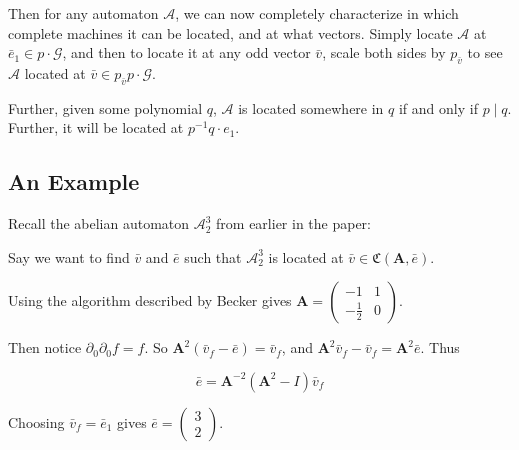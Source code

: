 \documentclass[12pt]{article}
\newcommand{\A}{\mathcal{A}}
\newcommand{\G}{\mathcal{G}}
\newcommand{\C}{\mathfrak{C}(\Am,\e)}
\newcommand{\2}{\textbf{2}}
\newcommand{\Am}{\textbf{A}}
\newcommand{\del}{\partial}
\renewcommand{\v}{\bar{v}}
\newcommand{\e}{\bar{e}}
\begin{document}
Then for any automaton $\A$, we can now completely characterize in
which complete machines it can be located, and at what vectors.
Simply locate $\A$ at $\e_1 \in p \cdot \G$, and then to locate it at
any odd vector $\v$, scale both sides by $p_{\v}$ to see $\A$ located at
$\v \in p_{\v} p \cdot \G$.

Further, given some polynomial $q$, $\A$ is located somewhere in $q$ 
if and only if $p \mid q$. Further, it will be located at 
$p^{-1}q \cdot e_1$.

\subsection{An Example}

Recall the abelian automaton $\A^3_2$ from earlier in the paper:

\begin{center}
\end{center}

Say we want to find $\v$ and $\e$ such that $\A^3_2$ is located at 
$\v \in \C$.

Using the algorithm described by Becker gives 
$\Am = \begin{pmatrix} -1 & 1 \\ -\frac{1}{2} & 0 \end{pmatrix}$.

Then notice $\del_0 \del_0 f = f$.
So $\Am^2 (\v_f - \e) = \v_f$, and
$\Am^2 \v_f - \v_f = \Am^2 \e$. Thus

\[ \e = \Am^{-2} (\Am^2 - I) \v_f \]

Choosing $\v_f = \e_1$ gives $\e = \begin{pmatrix} 3 \\ 2 \end{pmatrix}$.
\end{document}
